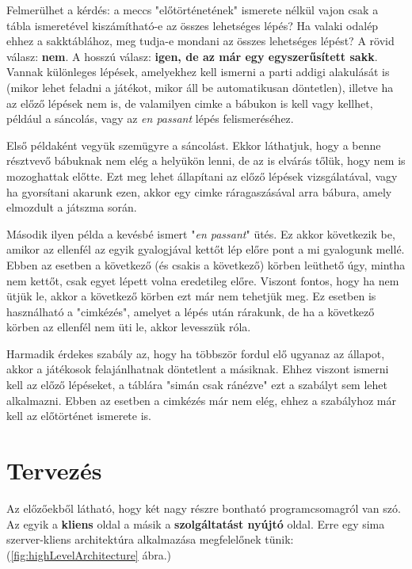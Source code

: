 \documentclass[twoside, a4paper, 12pt]{book}
\begin{document}
Felmerülhet a kérdés: a meccs "előtörténetének" ismerete nélkül vajon csak a tábla ismeretével kiszámítható-e az összes lehetséges lépés? Ha valaki odalép ehhez a sakktáblához, meg tudja-e mondani az összes lehetséges lépést? A rövid válasz: \textbf{nem}. A hosszú válasz: \textbf{igen, de az már egy egyszerűsített sakk}. Vannak különleges lépések, amelyekhez kell ismerni a parti addigi alakulását is (mikor lehet feladni a játékot, mikor áll be automatikusan döntetlen), illetve ha az előző lépések nem is, de valamilyen cimke a bábukon is kell vagy kellhet, például a sáncolás, vagy az \textit{en passant} lépés felismeréséhez.

Első példaként vegyük szemügyre a sáncolást. Ekkor láthatjuk, hogy a benne résztvevő bábuknak nem elég a helyükön lenni, de az is elvárás tőlük, hogy nem is mozoghattak előtte. Ezt meg lehet állapítani az előző lépések vizsgálatával, vagy ha gyorsítani akarunk ezen, akkor egy cimke ráragaszásával arra bábura, amely elmozdult a játszma során.

Második ilyen példa a kevésbé ismert "\textit{en passant}" ütés. Ez akkor következik be, amikor az ellenfél az egyik gyalogjával kettőt lép előre pont a mi gyalogunk mellé. Ebben az esetben a következő (és csakis a következő) körben leüthető úgy, mintha nem kettőt, csak egyet lépett volna eredetileg előre. Viszont fontos, hogy ha nem ütjük le, akkor a következő körben ezt már nem tehetjük meg. Ez esetben is használható a "cimkézés", amelyet a lépés után rárakunk, de ha a következő körben az ellenfél nem üti le, akkor levesszük róla.

Harmadik érdekes szabály az, hogy ha többször fordul elő ugyanaz az állapot, akkor a játékosok felajánlhatnak döntetlent a másiknak. Ehhez viszont ismerni kell az előző lépéseket, a táblára "simán csak ránézve" ezt a szabályt sem lehet alkalmazni. Ebben az esetben a cimkézés már nem elég, ehhez a szabályhoz már kell az előtörténet ismerete is.

\newpage
\chapter{Tervezés}
Az előzőekből látható, hogy két nagy részre bontható programcsomagról van szó. Az egyik a \textbf{kliens} oldal a másik a \textbf{szolgáltatást nyújtó} oldal. Erre egy sima szerver-kliens architektúra alkalmazása megfelelőnek tünik: (\ref{fig:highLevelArchitecture} ábra.)
\end{document}
